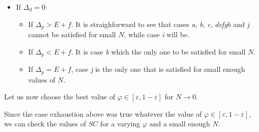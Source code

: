 \documentclass[english, a4paper]{article}
\theoremstyle{plain}
\theoremstyle{definition}
\theoremstyle{remark}
\begin{document}
\begin{itemize}
        \item If $\Delta_d = 0$: \begin{itemize}
            \item If $\Delta_p > E + f$. It is straighforward to see that cases \emph{a}, \emph{b}, \emph{c}, \emph{defgh} and \emph{j} cannot be satisfied for small $N$, while case \emph{i} will be.
            \item If $\Delta_p < E + f$. It is case \emph{b} which the only one to be satisfied for small $N$.
            \item If $\Delta_p = E + f$, case \emph{j} is the only one that is satisfied for small enough values of $N$.
        \end{itemize}
    \end{itemize}

        Let us now choose the best value of $\varphi \in [\varepsilon, 1 - \varepsilon]$ for $N \rightarrow 0$.

        Since the case exhaustion above was true whatever the value of $\varphi \in [\varepsilon, 1 - \varepsilon]$, we can check the values of $SC$ for a varying $\varphi$ and a small enough $N$.
\end{document}
